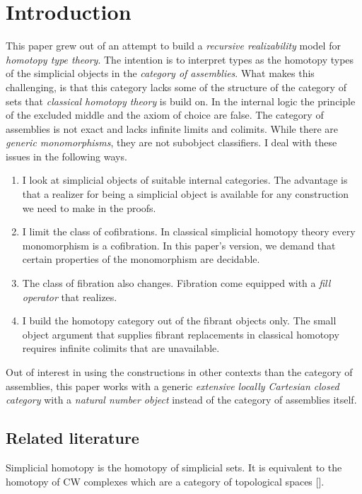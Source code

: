 \documentclass{tac}
\newcommand\hide[1]{}
\newcommand\citep[1]{[\cite{#1}]}
\begin{document}
\section{Introduction}
This paper grew out of an attempt to build a \emph{recursive realizability} model for \emph{homotopy type theory}. The intention is to interpret types as the homotopy types of the simplicial objects in the \emph{category of assemblies}. What makes this challenging, is that this category lacks some of the structure of the category of sets that \emph{classical homotopy theory} is build on. In the internal logic the principle of the excluded middle and the axiom of choice are false. The category of assemblies is not exact and lacks infinite limits and colimits. While there are \emph{generic monomorphisms}, they are not subobject classifiers. I deal with these issues in the following ways.
\begin{enumerate}
\item I look at simplicial objects of suitable internal categories. The advantage is that a realizer for being a simplicial object is available for any construction we need to make in the proofs.
\item I limit the class of cofibrations. In classical simplicial homotopy theory every monomorphism is a cofibration. In this paper's version, we demand that certain properties of the monomorphism are decidable.
\item The class of fibration also changes. Fibration come equipped with a \emph{fill operator} that realizes.
\item I build the homotopy category out of the fibrant objects only. The small object argument that supplies fibrant replacements in classical homotopy requires infinite colimits that are unavailable.
\end{enumerate}
Out of interest in using the constructions in other contexts than the category of assemblies, this paper works with a generic \emph{extensive locally Cartesian closed category} with a \emph{natural number object} instead of the category of assemblies itself.


\hide{
Take the exact completion of a ELCCC with NNO. The result is a $\Pi$-pretopos with NNO, enough projective and projectives that form a locally Cartesian closed subcategory. Not necessarily all W-types are available, but I don't need them in my proofs. The advantage is that I can get away from Thomas' extensional type theory, and back to the exact completions I am at home in.
}

\subsection{Related literature}
Simplicial homotopy is the homotopy of simplicial sets. It is equivalent to the homotopy of CW complexes which are a category of topological spaces \citep{Hovey99,GJSHT}.
\end{document}
